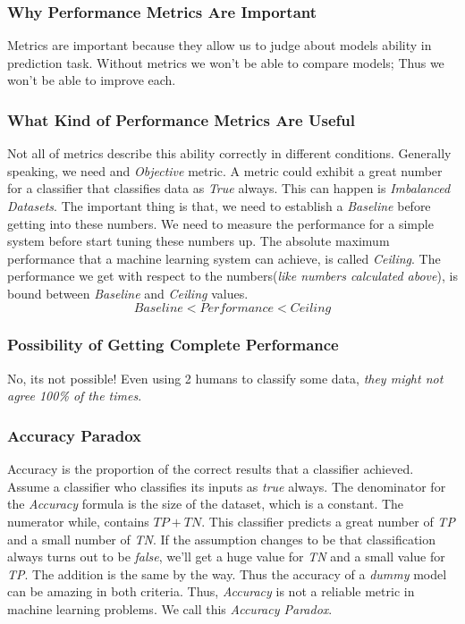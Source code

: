 \documentclass[12pt]{article}
\numberwithin{equation}{section}
\numberwithin{table}{section}
\numberwithin{figure}{section}
\begin{document}
\subsubsection*{Why Performance Metrics Are Important}
Metrics are important because they allow us to judge about models ability in prediction task. Without metrics we won't be able to compare models; Thus we won't be able to improve each.
\subsubsection*{What Kind of Performance Metrics Are Useful}
Not all of metrics describe this ability correctly in different conditions. Generally speaking, we need and \textit{Objective} metric. A metric could exhibit a great number for a classifier that classifies data as \textit{True} always. This can happen is \textit{Imbalanced Datasets}. The important thing is that, we need to establish a \textit{Baseline} before getting into these numbers. We need to measure the performance for a simple system before start tuning these numbers up.
The absolute maximum performance that a machine learning system can achieve, is called \textit{Ceiling}. The performance we get with respect to the numbers(\textit{like numbers calculated above}), is bound between \textit{Baseline} and \textit{Ceiling} values.
\begin{equation}
	Baseline < Performance < Ceiling
\end{equation}
\subsubsection*{Possibility of Getting Complete Performance}
No, its not possible! Even using 2 humans to classify some data, \textit{they might not agree 100\% of the times}.

\subsubsection*{Accuracy Paradox}
Accuracy is the proportion of the correct results that a classifier achieved. Assume a classifier who classifies its inputs as \textit{true} always. The denominator for the \textit{Accuracy} formula is the size of the dataset, which is a constant. The numerator while, contains $TP + TN$. This classifier predicts a great number of \textit{TP} and a small number of \textit{TN}. If the assumption changes to be that classification always turns out to be \textit{false}, we'll get a huge value for \textit{TN} and a small value for \textit{TP}. The addition is the same by the way. Thus the accuracy of a \textit{dummy} model can be amazing in both criteria. Thus, \textit{Accuracy} is not a reliable metric in machine learning problems. We call this \textit{Accuracy Paradox}. 
\end{document}
